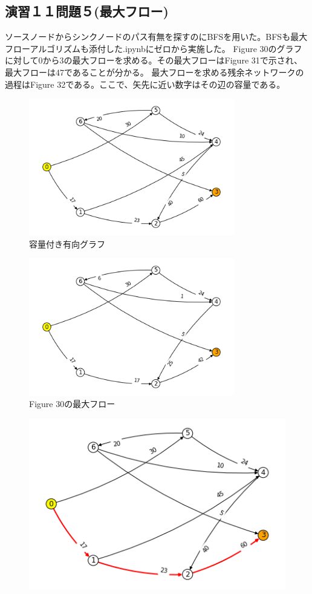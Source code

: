 \documentclass{report}
\begin{document}
\begin{CJK}{UTF8}{min}
    \clearpage
    \section*{演習１１問題５(最大フロー)}
    ソースノードからシンクノードのパス有無を探すのにBFSを用いた。BFSも最大フローアルゴリズムも添付した.ipynbにゼロから実施した。
    Figure 30のグラフに対して0から3の最大フローを求める。その最大フローはFigure 31で示され、最大フローは47であることが分かる。
    最大フローを求める残余ネットワークの過程はFigure 32である。ここで、矢先に近い数字はその辺の容量である。
    \begin{figure}[!h]
        \centerline{\includegraphics[width=0.8\textwidth]{data/ex11-MF-start.png}}
        \caption{容量付き有向グラフ}
    \end{figure}
    \begin{figure}[!h]
        \centerline{\includegraphics[width=0.8\textwidth]{data/ex11-MF-res.png}}
        \caption{Figure 30の最大フロー}
    \end{figure}
    \begin{figure}
        \includegraphics[width=.49\textwidth]{data/ex11-MF-1.png}\hfill

\end{figure}
\end{CJK}
\end{document}
